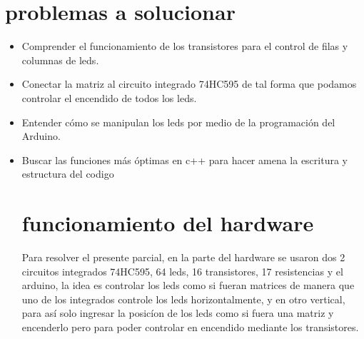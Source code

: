 \documentclass{article}
\begin{document}
\section{ problemas a solucionar }
\begin{itemize}
\item Comprender el funcionamiento de los transistores para el control de filas y columnas de leds.
\item Conectar la matriz al circuito integrado 74HC595 de tal forma que podamos controlar el encendido de todos los leds.
\item Entender cómo se manipulan los leds por medio de la programación del Arduino.
\item Buscar las funciones más óptimas en c++ para hacer amena la escritura y estructura del codigo
\section{funcionamiento del hardware}
Para resolver el presente parcial, en la parte del hardware  se usaron dos 2 circuitos integrados 74HC595, 64 leds, 16 transistores, 17 resistencias y el arduino, la idea es  controlar los leds como si fueran matrices de manera que uno de los integrados controle los leds horizontalmente, y en otro vertical, para  así solo ingresar la posicíon de los leds como si fuera una matriz y encenderlo pero para poder controlar en encendido  mediante los transistores.


\end{itemize} 
\end{document}
